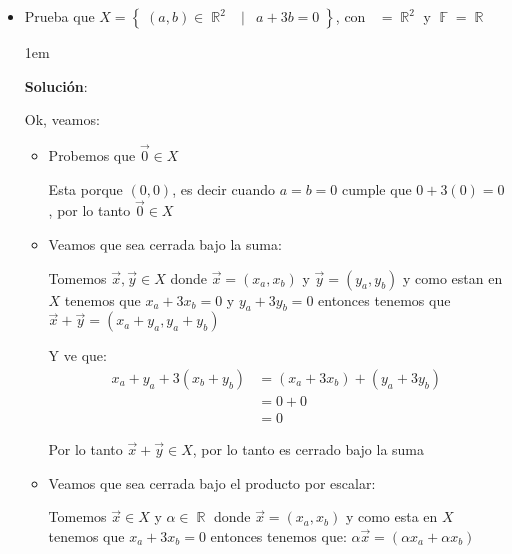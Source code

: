 \documentclass[12pt, fleqn]{article}                             %
\newenvironment{SmallIndentation}[1][0.75em]                    %
        {\begin{adjustwidth}{#1}{}\begin{footnotesize}}             %
        {\end{footnotesize}\end{adjustwidth}}                       %
\DeclareMathOperator \Space {\quad}                             %
\DeclareMathOperator \MiniSpace {\;}                            %
\newcommand \Such {\MiniSpace | \MiniSpace}                     %
\theoremstyle{break}                                            %
\DeclareMathOperator \Reals        {\mathbb{R}}                 %
\DeclareMathOperator \GenericField {\mathbb{F}}                 %
\DeclareMathOperator \VectorSet    {\mathbb{V}}                 %
\DeclareMathOperator \VectorSpace  {\VectorSet_{\GenericField}} %
\newcommand{\Set}[1]    {\left\{ \; #1 \; \right\}}             %
\begin{document}
        \begin{itemize}
            

            \item 
                Prueba que $X = \Set{(a, b) \in \Reals^2 \Such a + 3b = 0}$, con 
                $\VectorSpace = \Reals^2$ y $\GenericField = \Reals$


                \begin{SmallIndentation}[1em]
                    \textbf{Solución}:

                    Ok, veamos:
                    \begin{itemize}
                        
                        \item Probemos que $\vec 0 \in X$

                            Esta porque $(0, 0)$, es decir cuando $a = b = 0$ cumple que $0 + 3(0) = 0$, por
                            lo tanto $\vec 0 \in X$

                        \item
                            Veamos que sea cerrada bajo la suma:

                            Tomemos $\vec x, \vec y \in X$ donde $\vec x = (x_a, x_b)$ y $\vec y = (y_a, y_b)$
                            y como estan en $X$ tenemos que $x_a + 3x_b = 0$ y $y_a + 3y_b = 0$ entonces
                            tenemos que $\vec x + \vec y = (x_a + y_a, y_a + y_b)$

                            Y ve que:
                            \begin{align*}
                                x_a + y_a + 3(x_b + y_b)
                                    &= (x_a + 3x_b) + (y_a + 3y_b)      \\
                                    &= 0 + 0                            \\
                                    &= 0
                            \end{align*}

                            Por lo tanto $\vec x + \vec y \in X$, por lo tanto es cerrado bajo la suma

                        \item
                            Veamos que sea cerrada bajo el producto por escalar:

                            Tomemos $\vec x \in X$ y $\alpha \in \Reals$ donde $\vec x = (x_a, x_b)$ y como
                            esta en $X$ tenemos que $x_a + 3x_b = 0$ entonces tenemos que:
                            $\alpha \vec x = (\alpha x_a + \alpha x_b)$


\end{itemize}
\end{SmallIndentation}
\end{itemize}
\end{document}
